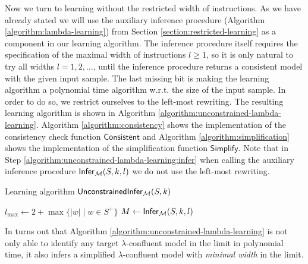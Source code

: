 Now we turn to learning without the restricted width of instructions. As we have already stated we will use the auxiliary inference procedure (Algorithm \ref{algorithm:lambda-learning}) from Section \ref{section:restricted-learning} as a component in our learning algorithm. The inference procedure itself requires the specification of the maximal width of instructions $l \ge 1$, so it is only natural to try all widths $l = 1, 2, \ldots$, until the inference procedure returns a consistent model with the given input sample. The last missing bit is making the learning algorithm a polynomial time algorithm w.r.t. the size of the input sample. In order to do so, we restrict ourselves to the left-most rewriting. The resulting learning algorithm is shown in Algorithm \ref{algorithm:unconstrained-lambda-learning}. Algorithm \ref{algorithm:consistency} shows the implementation of the consistency check function $\mathsf{Consistent}$ and Algorithm \ref{algorithm:simplification} shows the implementation of the simplification function $\mathsf{Simplify}$. Note that in Step \ref{algorithm:unconstrained-lambda-learning:infer} when calling the auxiliary inference procedure $\mathsf{Infer}_{\textup{\sf $\mathcal{M}$}}(S, k, l)$ we do not use the left-most rewriting.

\begin{algorithm}
\caption{Learning algorithm $\mathsf{UnconstrainedInfer}_{\textup{\sf $\mathcal{M}$}}(S, k)$}
\label{algorithm:unconstrained-lambda-learning}
\LinesNumbered
{}
$l_{\max} \leftarrow 2 + \max\{ |w| \mid w \in S^+ \}$\;
{$M \leftarrow \mathsf{Infer}_{\textup{\sf $\mathcal{M}$}}(S, k, l)$\label{algorithm:unconstrained-lambda-learning:infer}\;
}
\label{algorithm:unconstrained-lambda-learning:end}\;
\end{algorithm}

In turns out that Algorithm \ref{algorithm:unconstrained-lambda-learning} is not only able to identify any target $\lambda$-confluent model in the limit in polynomial time, it also infers a simplified $\lambda$-confluent model with \emph{minimal width} in the limit.

